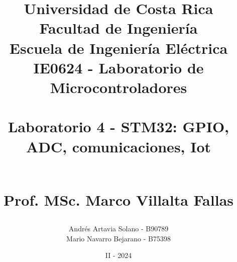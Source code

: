 \documentclass[12pt,a4paper]{article}
\title{Universidad de Costa Rica\\{\small Facultad de Ingeniería \\Escuela de Ingeniería Eléctrica\\IE0624 - Laboratorio de Microcontroladores \\\vspace*{2in}}\\ \textbf{Laboratorio 4 - STM32: GPIO, ADC, comunicaciones, Iot}  \vspace*{0.55in}\\ 
\author{Andrés Artavia Solano - B90789 \\ Mario Navarro Bejarano - B75398  \vspace*{3.0in}}\\ Prof. MSc. Marco Villalta Fallas
\vspace*{0.8in}}
\date{II - 2024}
\begin{document}
 

\maketitle  
\thispagestyle{empty}%
\renewcommand{\thepage}{\roman{page}}
\newpage
\tableofcontents
\newpage
\renewcommand{\thepage}{\arabic{page}} 
\setcounter{page}{1}


\newpage

\newpage

\newpage

\newpage

\newpage

\newpage

\end{document}
